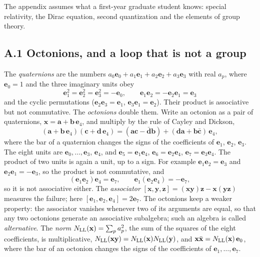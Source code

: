 \documentclass[
  10pt,
]{article}
\begin{document}
The appendix assumes what a first-year graduate student knows: special
relativity, the Dirac equation, second quantization and the elements of
group theory.

\hypertarget{a.1-octonions-and-a-loop-that-is-not-a-group}{%
\subsection{A.1 Octonions, and a loop that is not a
group}\label{a.1-octonions-and-a-loop-that-is-not-a-group}}

The \emph{quaternions} are the numbers
\(a_0\mathbf e_0+a_1\mathbf e_1+a_2\mathbf e_2+a_3\mathbf e_3\) with
real \(a_p\), where \(\mathbf e_0=1\) and the three imaginary units obey
\[\mathbf e_1^2=\mathbf e_2^2=\mathbf e_3^2=-\mathbf e_0,\qquad\mathbf e_1\mathbf e_2=-\mathbf e_2\mathbf e_1=\mathbf e_3\tag{A.1}\]
and the cyclic permutations (\(\mathbf e_2\mathbf e_3=\mathbf e_1\),
\(\mathbf e_3\mathbf e_1=\mathbf e_2\)). Their product is associative
but not commutative. The \emph{octonions} double them. Write an octonion
as a pair of quaternions,
\(\mathbf x=\mathbf a+\mathbf b\,\mathbf e_4\), and multiply by the rule
of Cayley and Dickson,
\[(\mathbf a+\mathbf b\,\mathbf e_4)(\mathbf c+\mathbf d\,\mathbf e_4)=(\mathbf a\mathbf c-\bar{\mathbf d}\mathbf b)+(\mathbf d\mathbf a+\mathbf b\bar{\mathbf c})\,\mathbf e_4,\tag{A.2}\]
where the bar of a quaternion changes the signs of the coefficients of
\(\mathbf e_1\), \(\mathbf e_2\), \(\mathbf e_3\). The eight units are
\(\mathbf e_0,\dots,\mathbf e_3\), \(\mathbf e_4\), and
\(\mathbf e_5=\mathbf e_1\mathbf e_4\),
\(\mathbf e_6=\mathbf e_2\mathbf e_4\),
\(\mathbf e_7=\mathbf e_3\mathbf e_4\). The product of two units is
again a unit, up to a sign. For example
\(\mathbf e_1\mathbf e_2=\mathbf e_{3}\) and
\(\mathbf e_2\mathbf e_1=-\mathbf e_{3}\), so the product is not
commutative, and
\[(\mathbf e_1\mathbf e_2)\mathbf e_4=\mathbf e_{7},\qquad\mathbf e_1(\mathbf e_2\mathbf e_4)=-\mathbf e_{7},\tag{A.3}\]
so it is not associative either. The \emph{associator}
\([\mathbf x,\mathbf y,\mathbf z]=(\mathbf x\mathbf y)\mathbf z-\mathbf x(\mathbf y\mathbf z)\)
measures the failure; here
\([\mathbf e_1,\mathbf e_2,\mathbf e_4]=2\mathbf e_{7}\). The octonions
keep a weaker property: the associator vanishes whenever two of its
arguments are equal, so that any two octonions generate an associative
subalgebra; such an algebra is called \emph{alternative}. The
\emph{norm} \(N_{\rm LL}(\mathbf x)=\sum_pa_p^2\), the sum of the
squares of the eight coefficients, is multiplicative,
\(N_{\rm LL}(\mathbf x\mathbf y)=N_{\rm LL}(\mathbf x)N_{\rm LL}(\mathbf y)\),
and \(\mathbf x\bar{\mathbf x}=N_{\rm LL}(\mathbf x)\,\mathbf e_0\),
where the bar of an octonion changes the signs of the coefficients of
\(\mathbf e_1,\dots,\mathbf e_7\).
\end{document}
